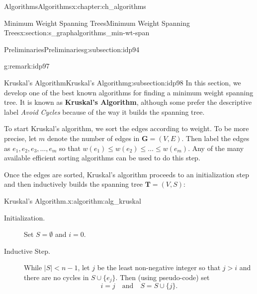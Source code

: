 \documentclass[oneside,10pt,]{book}
\newcommand{\terminology}[1]{\textbf{#1}}
\numberwithin{equation}{section}
\newcommand{\GVE}{\mathbf{G}=(V,E)}
\newcommand{\bfT}{\mathbf{T}}
\newcommand{\lt}{<}
\begin{document}
\begin{chapterptx}{Algorithms}{}{Algorithms}{}{}{x:chapter:ch_algorithms}
\begin{sectionptx}{Minimum Weight Spanning Trees}{}{Minimum Weight Spanning Trees}{}{}{x:section:s_graphalgorithms_min-wt-span}
\begin{subsectionptx}{Preliminaries}{}{Preliminaries}{}{}{g:subsection:idp94}
\begin{remark}{}{g:remark:idp97}
\end{remark}
\end{subsectionptx}
%
%
\typeout{************************************************}
\typeout{************************************************}
%
\begin{subsectionptx}{Kruskal's Algorithm}{}{Kruskal's Algorithm}{}{}{g:subsection:idp98}
In this section, we develop one of the best known algorithms for finding a minimum weight spanning tree. It is known as \terminology{Kruskal's Algorithm}, although some prefer the descriptive label \emph{Avoid Cycles} because of the way it builds the spanning tree.%
\par
To start Kruskal's algorithm, we sort the edges according to weight.  To be more precise, let \(m\) denote the number of edges in \(\GVE\).  Then label the edges as \(e_1,e_2,e_3,\dots,e_m\) so that \(w(e_1)\le w(e_2)\le \dots \le w(e_m)\). Any of the many available efficient sorting algorithms can be used to do this step.%
\par
Once the edges are sorted, Kruskal's algorithm proceeds to an initialization step and then inductively builds the spanning tree \(\bfT=(V,S)\):%
\begin{algorithm}{Kruskal's Algorithm.}{}{x:algorithm:alg_kruskal}%
%
%
%
\begin{description}
\item[{Initialization.}]Set \(S=\emptyset\) and \(i=0\).%
\item[{Inductive Step.}]While \(|S| \lt n-1\), let \(j\) be the least non-negative integer so that \(j > i\) and there are no cycles in \(S\cup\{e_j\}\). Then (using pseudo-code) set%
\begin{equation*}
i = j\quad\text{and} \quad S= S\cup\{j\}.
\end{equation*}
%
\end{description}
%
\end{algorithm}

\end{subsectionptx}
\end{sectionptx}
\end{chapterptx}
\end{document}
